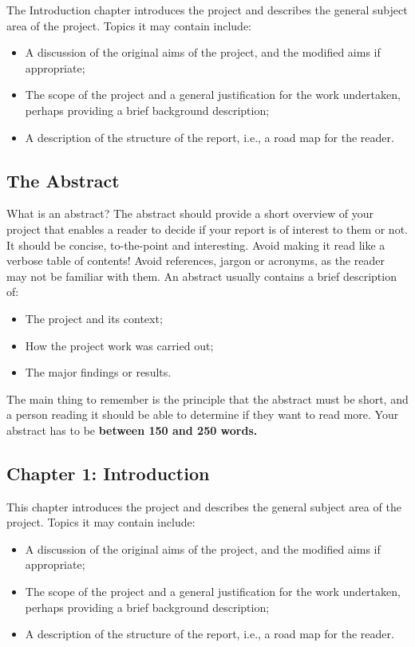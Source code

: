\documentclass[]{final_report}
\begin{document}
The Introduction chapter introduces the project and describes the general subject area of the project. Topics it may contain include:

\begin{itemize}
\item A discussion of the original aims of the project, and the modified aims if appropriate;
\item The scope of the project and a general justification for the work undertaken, perhaps providing a brief background description;
\item A description of the structure of the report, i.e., a road map for the reader.
\end{itemize}


\subsection{The Abstract}

What is an abstract? The abstract should provide a short overview of your project that enables a reader to decide if your report is of interest to them or not. It should be concise, to-the-point and interesting. Avoid making it read like a verbose table of contents! Avoid references, jargon or acronyms, as the reader may not be familiar with them. An abstract usually contains a brief description of:

\begin{itemize}
\item The project and its context;
\item How the project work was carried out;
\item The major findings or results.
\end{itemize}

The main thing to remember is the principle that the abstract must be short, and a person reading it should be able to determine if they want to read more. Your abstract has to be \textbf{between 150 and 250 words.}


\subsection{Chapter 1: Introduction}

This chapter introduces the project and describes the general subject area of the project. Topics it may contain include:

\begin{itemize}
\item A discussion of the original aims of the project, and the modified aims if appropriate;
\item The scope of the project and a general justification for the work undertaken, perhaps providing a brief background description;
\item A description of the structure of the report, i.e., a road map for the reader.
\end{itemize}
\end{document}
